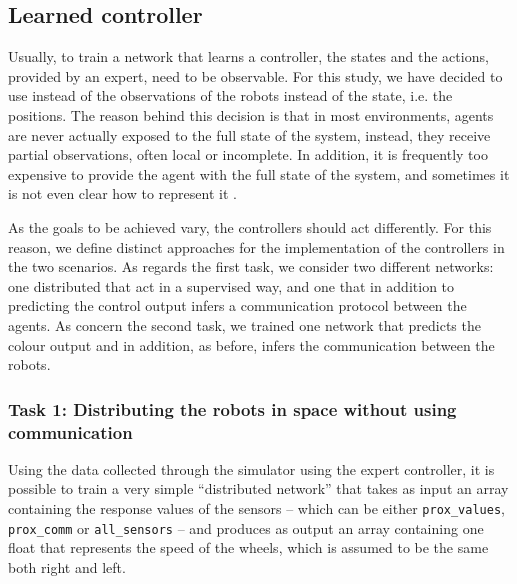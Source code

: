 \begin{lstlisting}[frame=none,caption=Protocol used from the manual controller 
to decide for each robot the message to transmit and the colour., 
label=lst:manualtask2]
\end{lstlisting}


\subsection{Learned controller}
\label{subsec:learned}

Usually, to train a network that learns a controller, the states and the actions, 
provided by an expert, need to be observable. For this study, we have decided to 
use instead of the observations of the robots instead of the state, i.e. the positions. 
The reason behind this decision is that in most environments, agents are never 
actually exposed to the full state of the system, instead, they receive partial 
observations, often local or incomplete. In addition, it is frequently too expensive 
to provide the agent with the full state of the system, and sometimes it is not even 
clear how to represent it \cite[][]{ml-agents}.

As the goals to be achieved vary, the controllers should act differently. For this 
reason, we define distinct approaches for the implementation of the controllers 
in the two scenarios.
As regards the first task, we consider two different networks: one distributed that 
act in a supervised way, and one that in addition to predicting the control output 
infers a communication protocol between the agents. 
As concern the second task, we trained one network that predicts the colour 
output and in addition, as before, infers the communication between the robots.

\subsubsection{Task 1: Distributing the robots in space without using 
communication}

Using the data collected through the simulator using the expert controller, it is 
possible to train a very simple ``distributed network'' that takes as input an array 
containing the response values of the sensors – which can be either 
\texttt{prox\_values}, \texttt{prox\_comm} or \texttt{all\_sensors} – and produces 
as output an array containing one float that represents the speed of the wheels, 
which is assumed to be the same both right and left.

